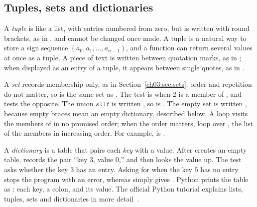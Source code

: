 \subsection*{Tuples, sets and dictionaries}
A \emph{tuple} is like a list, with entries numbered from zero, but is written with round brackets, as in , and cannot be changed once made. A tuple is a natural way to store a sign sequence $(a_0,a_1,\ldots,a_{n-1})$, and a function can return several values at once as a tuple. A piece of text is written between quotation marks, as in ; when displayed as an entry of a tuple, it appears between single quotes, as in .

A \emph{set} records membership only, as in Section~\ref{ch03:sec:sets}: order and repetition do not matter, so  is the same set as . The test  is  when $2$ is a member of , and  tests the opposite. The union $s\cup t$ is written , so  is . The empty set is written , because empty braces \code{\{\}} mean an empty dictionary, described below. A loop  visits the members of  in no promised order; when the order matters, loop over , the list of the members in increasing order. For example,  is \code{[1, 2, 3]}.

A \emph{dictionary} is a table that pairs each \emph{key} with a value. After  creates an empty table,  records the pair ``key $3$, value $0$,'' and  then looks the value up. The test  asks whether the key $3$ has an entry. Asking for  when the key $5$ has no entry stops the program with an error, whereas  simply gives . Python prints the table as : each key, a colon, and its value. The official Python tutorial explains lists, tuples, sets and dictionaries in more detail~\cite{pystructures}.

